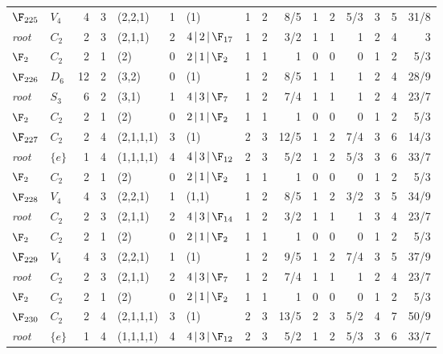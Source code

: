 \begin{landscape}
{\begin{longtable}{@{}l l r r l r l rrr rrr rrr@{}}
\addlinespace[3pt]
\textbf{$\F_{225}$} & $V_{4}$ & 4 & 3 & (2,2,1) & 1 & (1) & 1 & 2 & 8/5 & 1 & 2 & 5/3 & 3 & 5 & 31/8 \\
\quad\textit{root} & $C_{2}$ & 2 & 3 & (2,1,1) & 2 & $4\,|\,2\,|\,\F_{17}$ & 1 & 2 & 3/2 & 1 & 1 & 1 & 2 & 4 & 3 \\
\quad$\F_{2}$ & $C_{2}$ & 2 & 1 & (2) & 0 & $2\,|\,1\,|\,\F_{2}$ & 1 & 1 & 1 & 0 & 0 & 0 & 1 & 2 & 5/3 \\
\addlinespace[3pt]
\textbf{$\F_{226}$} & $D_{6}$ & 12 & 2 & (3,2) & 0 & (1) & 1 & 2 & 8/5 & 1 & 1 & 1 & 2 & 4 & 28/9 \\
\quad\textit{root} & $S_{3}$ & 6 & 2 & (3,1) & 1 & $4\,|\,3\,|\,\F_{7}$ & 1 & 2 & 7/4 & 1 & 1 & 1 & 2 & 4 & 23/7 \\
\quad$\F_{2}$ & $C_{2}$ & 2 & 1 & (2) & 0 & $2\,|\,1\,|\,\F_{2}$ & 1 & 1 & 1 & 0 & 0 & 0 & 1 & 2 & 5/3 \\
\addlinespace[3pt]
\textbf{$\F_{227}$} & $C_{2}$ & 2 & 4 & (2,1,1,1) & 3 & (1) & 2 & 3 & 12/5 & 1 & 2 & 7/4 & 3 & 6 & 14/3 \\
\quad\textit{root} & $\{e\}$ & 1 & 4 & (1,1,1,1) & 4 & $4\,|\,3\,|\,\F_{12}$ & 2 & 3 & 5/2 & 1 & 2 & 5/3 & 3 & 6 & 33/7 \\
\quad$\F_{2}$ & $C_{2}$ & 2 & 1 & (2) & 0 & $2\,|\,1\,|\,\F_{2}$ & 1 & 1 & 1 & 0 & 0 & 0 & 1 & 2 & 5/3 \\
\addlinespace[3pt]
\textbf{$\F_{228}$} & $V_{4}$ & 4 & 3 & (2,2,1) & 1 & (1,1) & 1 & 2 & 8/5 & 1 & 2 & 3/2 & 3 & 5 & 34/9 \\
\quad\textit{root} & $C_{2}$ & 2 & 3 & (2,1,1) & 2 & $4\,|\,3\,|\,\F_{14}$ & 1 & 2 & 3/2 & 1 & 1 & 1 & 3 & 4 & 23/7 \\
\quad$\F_{2}$ & $C_{2}$ & 2 & 1 & (2) & 0 & $2\,|\,1\,|\,\F_{2}$ & 1 & 1 & 1 & 0 & 0 & 0 & 1 & 2 & 5/3 \\
\addlinespace[3pt]
\textbf{$\F_{229}$} & $V_{4}$ & 4 & 3 & (2,2,1) & 1 & (1) & 1 & 2 & 9/5 & 1 & 2 & 7/4 & 3 & 5 & 37/9 \\
\quad\textit{root} & $C_{2}$ & 2 & 3 & (2,1,1) & 2 & $4\,|\,3\,|\,\F_{7}$ & 1 & 2 & 7/4 & 1 & 1 & 1 & 2 & 4 & 23/7 \\
\quad$\F_{2}$ & $C_{2}$ & 2 & 1 & (2) & 0 & $2\,|\,1\,|\,\F_{2}$ & 1 & 1 & 1 & 0 & 0 & 0 & 1 & 2 & 5/3 \\
\addlinespace[3pt]
\textbf{$\F_{230}$} & $C_{2}$ & 2 & 4 & (2,1,1,1) & 3 & (1) & 2 & 3 & 13/5 & 2 & 3 & 5/2 & 4 & 7 & 50/9 \\
\quad\textit{root} & $\{e\}$ & 1 & 4 & (1,1,1,1) & 4 & $4\,|\,3\,|\,\F_{12}$ & 2 & 3 & 5/2 & 1 & 2 & 5/3 & 3 & 6 & 33/7 \\

\end{longtable}}
\end{landscape}
